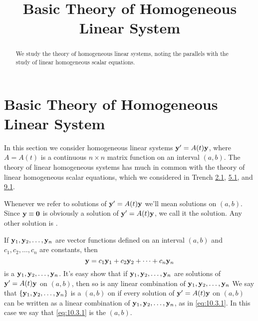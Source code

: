 \documentclass{ximera}
\title{Basic Theory of Homogeneous Linear System}%
\begin{document}
\begin{abstract}
We study the theory of homogeneous linear systems, noting the parallels with the study of linear homogeneous scalar equations.
\end{abstract}

\maketitle

\section*{Basic Theory of Homogeneous Linear System}

In this section we consider homogeneous linear systems ${\bf y}'=
A(t){\bf y}$, where $A=A(t)$ is a continuous $n\times n$ matrix
function on an interval $(a,b)$. The theory of linear homogeneous
systems has much in common with the theory of linear homogeneous
scalar equations, which we considered in
Trench \href{https://ximera.osu.edu/ode/main/linearFirstOrderDiffEq/linearFirstOrderDiffEq}{2.1}, \href{https://ximera.osu.edu/ode/main/homogeneousLinearEquations/homogeneousLinearEquations}{5.1}, and \href{https://ximera.osu.edu/ode/main/linearHigherOrder/linearHigherOrder}{9.1}.

Whenever we refer to solutions of ${\bf y}'=A(t){\bf y}$ we'll mean
solutions on $(a,b)$. Since ${\bf y}\equiv{\bf 0}$ is obviously a
solution of ${\bf y}'=A(t){\bf y}$, we call it the 
solution. Any other solution is .

If ${\bf y}_1, {\bf y}_2, \dots, {\bf y}_n$ are vector functions
defined on an interval $(a,b)$ and $c_1, c_2, \dots, c_n$ are
constants, then
\begin{equation} \label{eq:10.3.1}
{\bf y}=c_1{\bf y}_1+c_2{\bf y}_2+\cdots+c_n{\bf y}_n
\end{equation}
is a  ${\bf y}_1, {\bf y}_2, \ldots,{\bf
y}_n$. It's easy show that if ${\bf
y}_1, {\bf y}_2, \dots,{\bf y}_n$ are solutions of ${\bf y}'=A(t){\bf
y}$ on $(a,b)$, then so is any linear combination of
 ${\bf y}_1, {\bf y}_2, \dots, {\bf y}_n$ %
 We say that
$\{{\bf y}_1,{\bf y}_2,\dots,{\bf y}_n\}$ is a  $(a,b)$ on if every solution of
${\bf y}'=A(t){\bf y}$ on $(a,b)$ can be written as a linear combination of
${\bf y}_1, {\bf y}_2, \dots, {\bf y}_n$, as in \eqref{eq:10.3.1}.
In this
case we say that \eqref{eq:10.3.1} is the  $(a,b)$.
\end{document}
